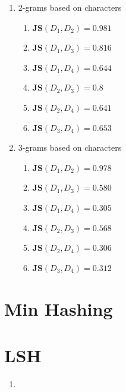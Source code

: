 \documentclass[11pt]{article}
\begin{document}
\begin{enumerate}[label=\textbf{\Alph*:}]
\begin{enumerate}[label=B.\arabic*]
\item
2-grams based on characters
\begin{enumerate}[label=\arabic*)]
\item
\textbf{JS}$(D_{1}, D_{2}) = 0.981$
\item
\textbf{JS}$(D_{1}, D_{3}) = 0.816$
\item
\textbf{JS}$(D_{1}, D_{4}) = 0.644$
\item
\textbf{JS}$(D_{2}, D_{3}) = 0.8$
\item
\textbf{JS}$(D_{2}, D_{4}) = 0.641$
\item
\textbf{JS}$(D_{3}, D_{4}) = 0.653$
\end{enumerate}
\item
3-grams based on characters
\begin{enumerate}[label=\arabic*)]
\item
\textbf{JS}$(D_{1}, D_{2}) = 0.978$
\item
\textbf{JS}$(D_{1}, D_{3}) = 0.580$
\item
\textbf{JS}$(D_{1}, D_{4}) = 0.305$
\item
\textbf{JS}$(D_{2}, D_{3}) = 0.568$
\item
\textbf{JS}$(D_{2}, D_{4}) = 0.306$
\item
\textbf{JS}$(D_{3}, D_{4}) = 0.312$
\end{enumerate}

\end{enumerate}

\end{enumerate}

\section{Min Hashing}

\section{LSH}
\begin{enumerate}[label=\Alph*]
\item


\end{enumerate}
\end{document}
